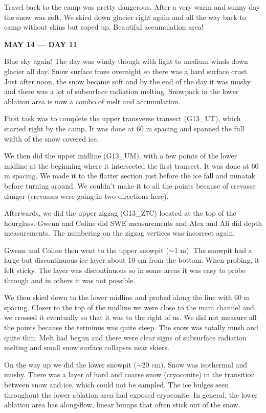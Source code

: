 \documentclass[12pt]{article}
\begin{document}
Travel back to the camp was pretty dangerous. After a very warm and sunny day the snow was soft. We skied down glacier right again and all the way back to camp without skins but roped up. Beautiful accumulation area!

\vspace{4mm}
\noindent \textbf{MAY 14 --- DAY 11}

Blue sky again! The day was windy though with light to medium winds down glacier all day. Snow surface froze overnight so there was a hard surface crust. Just after noon, the snow became soft and by the end of the day it was mushy and there was a lot of subsurface radiation melting. Snowpack in the lower ablation area is now a combo of melt and accumulation. 

First task was to complete the upper transverse transect (G13\_UT), which started right by the camp. It was done at 60 m spacing and spanned the full width of the snow covered ice.

We then did the upper midline (G13\_UM), with a few points of the lower midline at the beginning where it intersected the first transect. It was done at 60 m spacing. We made it to the flatter section just before the ice fall and nunatak before turning around. We couldn't make it to all the points because of crevasse danger (crevasses were going in two directions here). 

Afterwards, we did the upper zigzag (G13\_Z7C) located at the top of the hourglass. Gwenn and Coline did SWE measurements and Alex and Ali did depth measurements. The numbering on the zigzag vertices was incorrect again. 

Gwenn and Coline then went to the upper snowpit ($\sim$1 m). The snowpit had a large but discontinuous ice layer about 10 cm from the bottom. When probing, it felt sticky. The layer was discontinuous so in some areas it was easy to probe through and in others it was not possible. 

We then skied down to the lower midline and probed along the line with 60 m spacing. Closer to the top of the midline we were close to the main channel and we crossed it eventually so that it was to the right of us. We did not measure all the points because the terminus was quite steep. The snow was totally mush and quite thin. Melt had begun and there were clear signs of subsurface radiation melting and small snow surface collapses near skiers. 

On the way up we did the lower snowpit ($\sim$20 cm). Snow was isothermal and mushy. There was a layer of hard and coarse snow (cryoconite) in the transition between snow and ice, which could not be sampled. The ice bulges seen throughout the lower ablation area had exposed cryoconite. In general, the lower ablation area has along-flow, linear bumps that often stick out of the snow.
\end{document}
